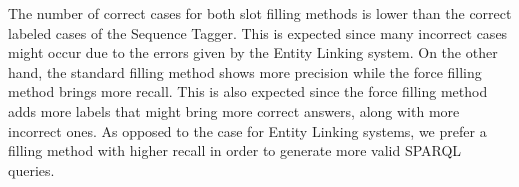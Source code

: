 \begin{table}[h!]
    \centering
    \caption{Results of the Slot Filling system using the force filling method.}
    \label{table:forceSlotFillingResults}
\end{table}

The number of correct cases for both slot filling methods is lower than the correct labeled cases 
of the Sequence Tagger. This is expected since many incorrect cases might occur due to the errors 
given by the Entity Linking system. On the other hand, the standard filling method shows more 
precision while the force filling method brings more recall. This is also expected since the force 
filling method adds more labels that might bring more correct answers, along with more incorrect 
ones. As opposed to the case for Entity Linking systems, we prefer a filling method with higher 
recall in order to generate more valid SPARQL queries.

